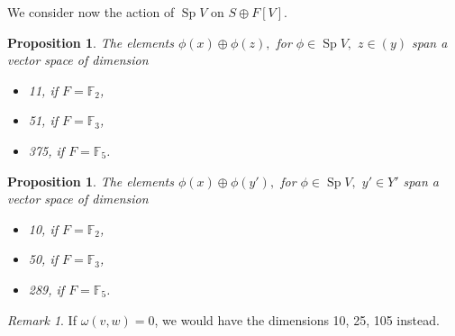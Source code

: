 \documentclass{amsart}
\DeclareMathOperator{\Sp}{Sp}
\DeclareMathOperator{\Sym}{Sym}
\newcommand{\Z}{\mathbb{Z}}
\theoremstyle{plain}
\newtheorem{proposition}[theorem]{Proposition}
\theoremstyle{definition}
\theoremstyle{remark}
\newtheorem{remark}[theorem]{Remark}
\begin{document}
We consider now the action of $\Sp V$ on $S\oplus F[V]$. 
\begin{proposition}
The elements $\phi(x)\oplus \phi(z),$ for $\phi \in \Sp V,$ $z \in (y)$ span a vector space of dimension
\begin{itemize}
\item 11, if $F=\mathbb F_2$,
\item 51, if $F=\mathbb F_3$,
\item 375, if $F=\mathbb F_5$.
\end{itemize}
\end{proposition}

\begin{proposition}
The elements $\phi(x)\oplus \phi(y'),$ for $\phi \in \Sp V,$ $y' \in Y'$ span a vector space of dimension
\begin{itemize}
\item 10, if $F=\mathbb F_2$,
\item 50, if $F=\mathbb F_3$,
\item 289, if $F=\mathbb F_5$.
\end{itemize}
\end{proposition}
\begin{remark}
If $\omega(v,w)=0$, we would have the dimensions 10, 25, 105 instead.
\end{remark}



\end{document}
